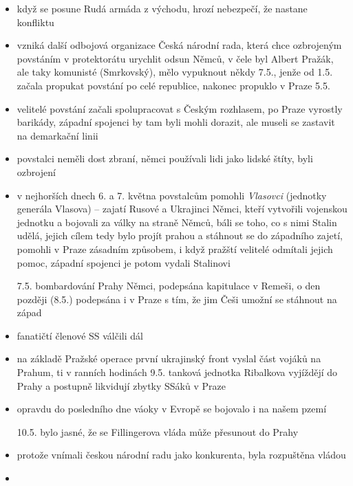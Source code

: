 \documentclass{article}
\begin{document}
\begin{itemize}
    \item když se posune Rudá armáda z východu, hrozí nebezpečí, že nastane konfliktu
    \item vzniká další odbojová organizace Česká národní rada, která chce ozbrojeným povstáním v protektorátu urychlit odsun Němců, v čele byl Albert Pražák, ale taky komunisté (Smrkovský), mělo vypuknout někdy 7.5., jenže od 1.5. začala propukat povstání po celé republice, nakonec propuklo v Praze 5.5.
    \item velitelé povstání začali spolupracovat s Českým rozhlasem, po Praze vyrostly barikády, západní spojenci by tam byli mohli dorazit, ale museli se zastavit na demarkační linii
    \item povstalci neměli dost zbraní, němci používali lidi jako lidské štíty, byli ozbrojení
    \item v nejhorších dnech 6. a 7. května povstalcům pomohli \textit{Vlasovci} (jednotky generála Vlasova) -- zajatí Rusové a Ukrajinci Němci, kteří vytvořili vojenskou jednotku a bojovali za války na straně Němců, báli se toho, co s nimi Stalin udělá, jejich cílem tedy bylo projít prahou a stáhnout se do západního zajetí, pomohli v Praze zásadním způsobem, i když pražští velitelé odmítali jejich pomoc, západní spojenci je potom vydali Stalinovi
    \item[7.5.] bombardování Prahy Němci, podepsána kapitulace v Remeši, o den později (8.5.) podepsána i v Praze s tím, že jim Češi umožní se stáhnout na západ
    \item fanatičtí členové SS válčili dál
    \item na základě Pražské operace první ukrajinský front vyslal část vojáků na Prahum, ti v ranních hodinách 9.5. tanková jednotka Ribalkova vyjíždějí do Prahy a postupně likvidují zbytky SSáků v Praze
    \item opravdu do posledního dne váoky v Evropě se bojovalo i na našem pzemí
    \item[10.5.] bylo jasné, že se Fillingerova vláda může přesunout do Prahy
    \item protože vnímali českou národní radu jako konkurenta, byla rozpuštěna vládou
    \item
\end{itemize}
\end{document}

